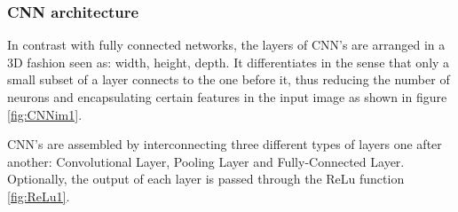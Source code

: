 \FloatBarrier

\subsubsection{CNN architecture}
In contrast with fully connected networks, the layers of CNN's are arranged in a 3D fashion seen as: width, height, depth. It differentiates in the sense that only a small subset of a layer connects to the one before it, thus reducing the number of neurons and encapsulating certain features in the input image as shown in  figure \ref{fig:CNNim1}. \

CNN's are assembled by interconnecting three different types of layers one after another: Convolutional Layer, Pooling Layer and Fully-Connected Layer. Optionally, the output of each layer is passed through the ReLu function \ref{fig:ReLu1}. 
